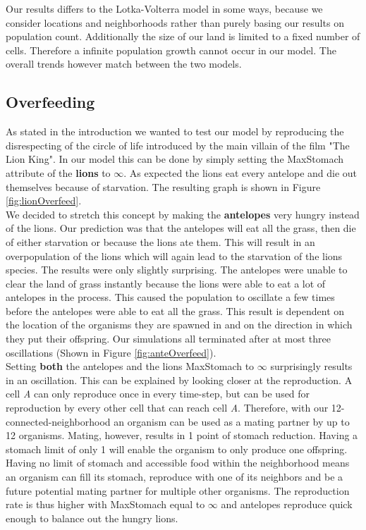 \documentclass[11pt]{article}
\begin{document}
Our results differs to the Lotka-Volterra model in some ways, because we consider locations and neighborhoods rather than purely basing our results on population count. Additionally the size of our land is limited to a fixed number of cells. Therefore a infinite population growth cannot occur in our model. The overall trends however match between the two models.

\subsection{Overfeeding}
As stated in the introduction we wanted to test our model by reproducing the disrespecting of the circle of life introduced by the main villain of the film "The Lion King". In our model this can be done by simply setting the MaxStomach attribute of the {\bf lions} to $\infty$. As expected the lions eat every antelope and die out themselves because of starvation. The resulting graph is shown in Figure \ref{fig:lionOverfeed}. \\
We decided to stretch this concept by making the {\bf antelopes} very hungry instead of the lions. Our prediction was that the antelopes will eat all the grass, then die of either starvation or because the lions ate them. This will result in an overpopulation of the lions which will again lead to the starvation of the lions species. The results were only slightly surprising. The antelopes were unable to clear the land of grass instantly because the lions were able to eat a lot of antelopes in the process. This caused the population to oscillate a few times before the antelopes were able to eat all the grass. This result is dependent on the location of the organisms they are spawned in and on the direction in which they put their offspring.  Our simulations all terminated after at most three oscillations (Shown in Figure \ref{fig:anteOverfeed}).\\
Setting {\bf both} the antelopes and the lions MaxStomach to $\infty$ surprisingly results in an oscillation. This can be explained by looking closer at the reproduction. A cell {\it A} can only reproduce once in every time-step, but can be used for reproduction by every other cell that can reach cell {\it A}. Therefore, with our 12-connected-neighborhood an organism can be used as a mating partner by up to 12 organisms. Mating, however, results in 1 point of stomach reduction. Having a stomach limit of only 1 will enable the organism to only produce one offspring. Having no limit of stomach and accessible food within the neighborhood means an organism can fill its stomach, reproduce with one of its neighbors and be a future potential mating partner for multiple other organisms. The reproduction rate is thus higher with MaxStomach equal to $\infty$ and antelopes reproduce quick enough to balance out the hungry lions.
\end{document}
